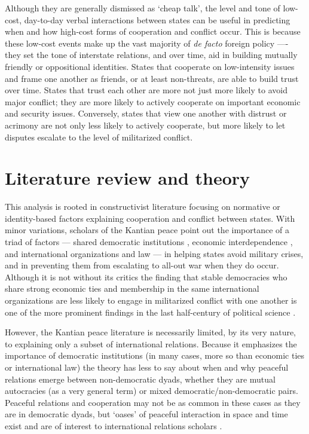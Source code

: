 \documentclass[10pt,]{article}
\let\stdsection\section
\renewcommand\section{\newpage\stdsection}
\begin{document}
Although they are generally dismissed as `cheap talk', the level and
tone of low-cost, day-to-day verbal interactions between states can be
useful in predicting when and how high-cost forms of cooperation and
conflict occur. This is because these low-cost events make up the vast
majority of \emph{de facto} foreign policy ---- they set the tone of
interstate relations, and over time, aid in building mutually friendly
or oppositional identities. States that cooperate on low-intensity
issues and frame one another as friends, or at least non-threats, are
able to build trust over time. States that trust each other are more not
just more likely to avoid major conflict; they are more likely to
actively cooperate on important economic and security issues.
Conversely, states that view one another with distrust or acrimony are
not only less likely to actively cooperate, but more likely to let
disputes escalate to the level of militarized conflict.

\section{Literature review and
theory}\label{literature-review-and-theory}

This analysis is rooted in constructivist literature focusing on
normative or identity-based factors explaining cooperation and conflict
between states. With minor variations, scholars of the Kantian peace
point out the importance of a triad of factors --- shared democratic
institutions
\citetext{\citealp[e.g.][1158]{Doyle1986a}; \citealp[626]{Russett1993}; \citealp[398-400]{Danilovic2007}},
economic interdependence \citep[e.g.][287-288]{Oneal2003}, and
international organizations and law \citep[e.g.][442]{Dorussen2008} ---
in helping states avoid military crises, and in preventing them from
escalating to all-out war when they do occur. Although it is not without
its critics
\citetext{\citealp[e.g.][174-175]{Gartzke2013}; \citealp[584-585]{Ward2007}}
the finding that stable democracies who share strong economic ties and
membership in the same international organizations are less likely to
engage in militarized conflict with one another is one of the more
prominent findings in the last half-century of political science
\citep[e.g.][388-398]{Oneal2003}.

However, the Kantian peace literature is necessarily limited, by its
very nature, to explaining only a subset of international relations.
Because it emphasizes the importance of democratic institutions (in many
cases, more so than economic ties or international law) the theory has
less to say about when and why peaceful relations emerge between
non-democratic dyads, whether they are mutual autocracies (as a very
general term) or mixed democratic/non-democratic pairs. Peaceful
relations and cooperation may not be as common in these cases as they
are in democratic dyads, but `oases' of peaceful interaction in space
and time exist and are of interest to international relations scholars
\citep[6]{Kivimaki2001}.
\end{document}
